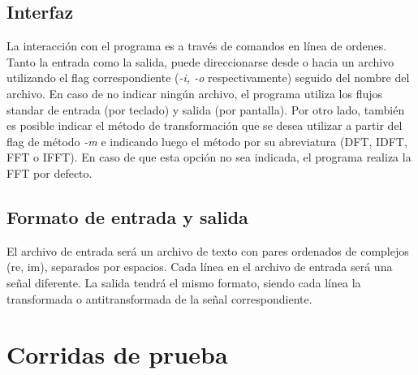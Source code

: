 \documentclass[12pt,a4paper]{report}
\begin{document}
		\subsection{Interfaz}

			\indent La interacción con el programa es a través de comandos en línea de ordenes. Tanto la entrada 
			como la salida, puede direccionarse desde o hacia un archivo utilizando el flag correspondiente (\textit{-i, -o}
			respectivamente) seguido del nombre del archivo. En caso de no indicar ningún archivo, el programa utiliza los 
			flujos standar de entrada (por teclado) y salida (por pantalla). Por otro lado, también es posible indicar el método 
			de transformación que se desea utilizar a partir del flag de método \textit{-m} e indicando luego el método por su
			abreviatura (DFT, IDFT, FFT o IFFT). En caso de que esta opción no sea indicada, el programa realiza la FFT por defecto.

		\subsection{Formato de entrada y salida}

			\indent El archivo de entrada será un archivo de texto con pares ordenados de complejos (re, im), separados por
			espacios. Cada línea en el archivo de entrada será una señal diferente. La salida tendrá el mismo formato, siendo 
			cada línea la transformada o antitransformada de la señal correspondiente. 


	\section{Corridas de prueba}
	 
\end{document}
